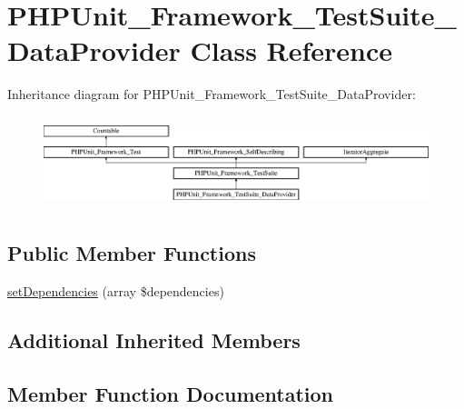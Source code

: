 \hypertarget{class_p_h_p_unit___framework___test_suite___data_provider}{}\section{P\+H\+P\+Unit\+\_\+\+Framework\+\_\+\+Test\+Suite\+\_\+\+Data\+Provider Class Reference}
\label{class_p_h_p_unit___framework___test_suite___data_provider}
Inheritance diagram for P\+H\+P\+Unit\+\_\+\+Framework\+\_\+\+Test\+Suite\+\_\+\+Data\+Provider\+:\begin{figure}[H]
\begin{center}
\leavevmode
\includegraphics[height=2.705314cm]{class_p_h_p_unit___framework___test_suite___data_provider}
\end{center}
\end{figure}
\subsection*{Public Member Functions}
\begin{DoxyCompactItemize}
\item 
\mbox{\hyperlink{class_p_h_p_unit___framework___test_suite___data_provider_ace722f9667f0876106c3eb82f91388bd}{set\+Dependencies}} (array \$dependencies)
\end{DoxyCompactItemize}
\subsection*{Additional Inherited Members}


\subsection{Member Function Documentation}
\mbox{\label{class_p_h_p_unit___framework___test_suite___data_provider_ace722f9667f0876106c3eb82f91388bd}} 
